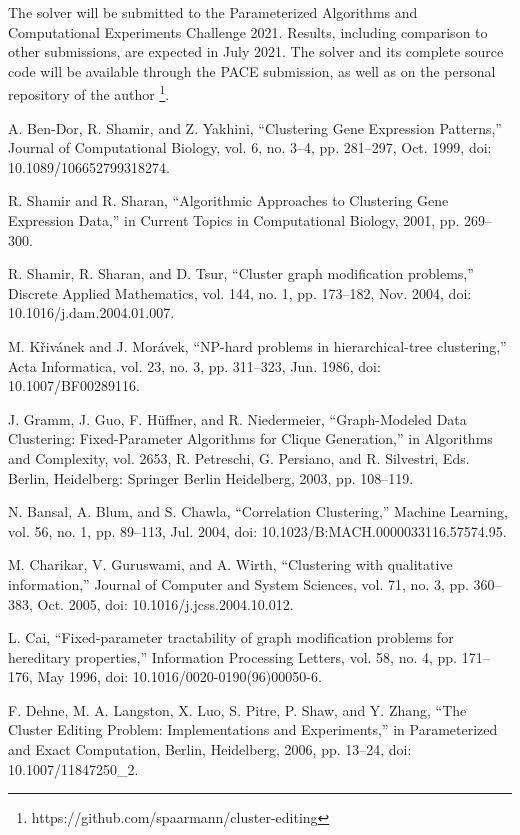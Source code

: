 \documentclass[12pt,oneside,english,parskip=full,headings=small]{scrbook}
\theoremstyle{definition}
\begin{document}
The solver will be submitted to the Parameterized Algorithms and Computational Experiments Challenge
2021. Results, including comparison to other submissions, are expected in July 2021. The solver and
its complete source code will be available through the PACE submission, as well as on the personal
repository of the author \footnote{https://github.com/spaarmann/cluster-editing}.

\begin{thebibliography}{99}

A. Ben-Dor, R. Shamir, and Z. Yakhini, “Clustering Gene Expression Patterns,” Journal of
Computational Biology, vol. 6, no. 3–4, pp. 281–297, Oct. 1999, doi: 10.1089/106652799318274.

R. Shamir and R. Sharan, “Algorithmic Approaches to Clustering Gene Expression Data,” in Current
Topics in Computational Biology, 2001, pp. 269–300.

R. Shamir, R. Sharan, and D. Tsur, “Cluster graph modification problems,” Discrete Applied
Mathematics, vol. 144, no. 1, pp. 173–182, Nov. 2004, doi: 10.1016/j.dam.2004.01.007.

M. Křivánek and J. Morávek, “NP-hard problems in hierarchical-tree clustering,” Acta Informatica,
vol. 23, no. 3, pp. 311–323, Jun. 1986, doi: 10.1007/BF00289116.

J. Gramm, J. Guo, F. Hüffner, and R. Niedermeier, “Graph-Modeled Data Clustering: Fixed-Parameter
Algorithms for Clique Generation,” in Algorithms and Complexity, vol. 2653, R. Petreschi, G.
Persiano, and R. Silvestri, Eds. Berlin, Heidelberg: Springer Berlin Heidelberg, 2003, pp. 108–119.

N. Bansal, A. Blum, and S. Chawla, “Correlation Clustering,” Machine Learning, vol. 56, no. 1,
pp. 89–113, Jul. 2004, doi: 10.1023/B:MACH.0000033116.57574.95.

M. Charikar, V. Guruswami, and A. Wirth, “Clustering with qualitative information,” Journal of
Computer and System Sciences, vol. 71, no. 3, pp. 360–383, Oct. 2005, doi:
10.1016/j.jcss.2004.10.012.

L. Cai, “Fixed-parameter tractability of graph modification problems for hereditary properties,”
Information Processing Letters, vol. 58, no. 4, pp. 171–176, May 1996, doi:
10.1016/0020-0190(96)00050-6.

F. Dehne, M. A. Langston, X. Luo, S. Pitre, P. Shaw, and Y. Zhang, “The Cluster Editing Problem:
Implementations and Experiments,” in Parameterized and Exact Computation, Berlin, Heidelberg, 2006,
pp. 13–24, doi: 10.1007/11847250\_2.


\end{thebibliography}
\end{document}
